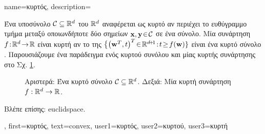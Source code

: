 {name={\foreignlanguage{greek}{κυρτός}},
	description={\foreignlanguage{greek}{Ένα υποσύνολο} $\mathcal{C} \subseteq \mathbb{R}^{d}$  
		\foreignlanguage{greek}{του}  $\mathbb{R}^{d}$ \foreignlanguage{greek}{αναφέρεται ως κυρτό αν περιέχει  
		το ευθύγραμμο τμήμα μεταξύ οποιωνδήποτε δύο σημεί\-ων ${\bf x}, {\bf y}\!\in\!\mathcal{C}$ σε ένα σύνολο. Μία συνάρτηση  
		$f\!:\!\mathbb{R}^{d}\!\rightarrow\!\mathbb{R}$ είναι κυρτή αν το} 
		 \foreignlanguage{greek}{της} $\big\{ \big( \weights^{T},t \big)^{T}\!\in\!\mathbb{R}^{\dimlocalmodel\!+\!1}\!:\!t\!\geq\!f(\weights) \}$ 
		\foreignlanguage{greek}{είναι ένα κυρτό σύνολο} \cite{BoydConvexBook}. \foreignlanguage{greek}{Παρουσιάζουμε ένα παράδειγμα 
		ενός κυρτού συνόλου και μίας κυρτής συνάρτησης στο Σχ.} \ref{fig_convex_set_function}. 
		\begin{figure}[H]
		\begin{center}
			\vspace*{-8mm}
			\end{center}
			{
			\caption{\foreignlanguage{greek}{Αριστερά: Ένα κυρτό σύνολο $\mathcal{C} \subseteq \mathbb{R}^{d}$. 
				Δεξιά: Μία κυρτή συνάρτηση} $f: \mathbb{R}^{d} \rightarrow \mathbb{R}$.\label{fig_convex_set_function}} }
		\end{figure}
		\foreignlanguage{greek}{Βλέπε επίσης:} \gls{euclidspace}.
		},
		first={\foreignlanguage{greek}{κυρτός}},
		text={convex},
		user1={\foreignlanguage{greek}{κυρτός}}, %
		user2={\foreignlanguage{greek}{κυρτού}}, %
		user3={\foreignlanguage{greek}{κυρτή}} %
}

